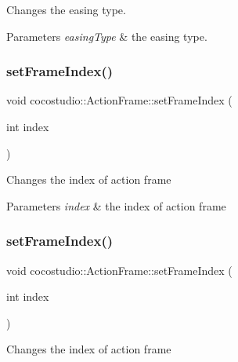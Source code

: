 Changes the easing type.


\begin{DoxyParams}{Parameters}
{\em easing\+Type} & the easing type. \\
\hline
\end{DoxyParams}
\mbox{\label{classcocostudio_1_1ActionFrame_adbca76015f4ce16ecb2bb0bca49ef712}} 
\subsubsection{\texorpdfstring{set\+Frame\+Index()}{setFrameIndex()}\hspace{0.1cm}{\footnotesize\ttfamily [1/2]}}
{\footnotesize\ttfamily void cocostudio\+::\+Action\+Frame\+::set\+Frame\+Index (\begin{DoxyParamCaption}\item[{int}]{index }\end{DoxyParamCaption})}

Changes the index of action frame


\begin{DoxyParams}{Parameters}
{\em index} & the index of action frame \\
\hline
\end{DoxyParams}
\mbox{\label{classcocostudio_1_1ActionFrame_adbca76015f4ce16ecb2bb0bca49ef712}} 
\subsubsection{\texorpdfstring{set\+Frame\+Index()}{setFrameIndex()}\hspace{0.1cm}{\footnotesize\ttfamily [2/2]}}
{\footnotesize\ttfamily void cocostudio\+::\+Action\+Frame\+::set\+Frame\+Index (\begin{DoxyParamCaption}\item[{int}]{index }\end{DoxyParamCaption})}

Changes the index of action frame


